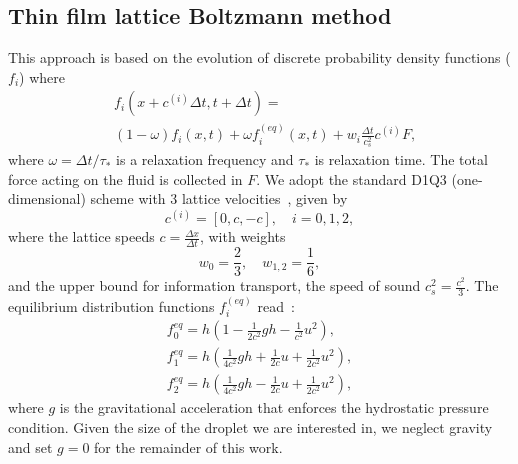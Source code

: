 \subsection{Thin film lattice Boltzmann method}\label{app:two}
This approach is based on the evolution of discrete probability density functions ($f_i$) where
\begin{equation}\label{eq:LBE_five}
    \begin{split}
        &f_i(x+c^{(i)}\Delta t,t+\Delta t) = \\
        &\left(1 - \omega\right) f_i(x,t) + \omega f_i^{(eq)}(x,t) + w_i \frac{\Delta t}{c_s^2} c^{(i)} F,
    \end{split}
\end{equation}
where $\omega = \Delta t/\tau_{\ast}$ is a relaxation frequency and $\tau_{\ast}$ is relaxation time. 
The total force acting on the fluid is collected in $F$.
We adopt the standard D1Q3 (one-dimensional) scheme with $3$ lattice velocities~\cite{krueger2017}, given by
\begin{equation}\label{eq:speeds_five}
c^{(i)}  = [0, c, -c], \quad i = 0, 1, 2,
\end{equation}
where the lattice speeds $c=\frac{\Delta x}{\Delta t}$, with weights
\begin{equation}
w_0 = \frac{2}{3},\quad w_{1,2} = \frac{1}{6},
\end{equation}
and the upper bound for information transport, the speed of sound $c_s^2=\frac{c^2}{3}$.
The equilibrium distribution functions $f_i^{(eq)}$ read~\cite{van2010study}:
\begin{gather}
    f_{0}^{eq} = h\left(1-\frac{1}{2c^2}gh - \frac{1}{c^2}u^2\right),\nonumber\\
    f_{1}^{eq} = h\left(\frac{1}{4c^2}gh + \frac{1}{2c}u + \frac{1}{2c^2}u^2\right)\label{eq:equilibria_five},\\
    f_{2}^{eq} = h\left(\frac{1}{4c^2}gh - \frac{1}{2c}u + \frac{1}{2c^2}u^2\right),\nonumber
\end{gather}
where $g$ is the gravitational acceleration that enforces the hydrostatic pressure condition. 
Given the size of the droplet we are interested in, we neglect gravity and set $g=0$ for the remainder of this work.


